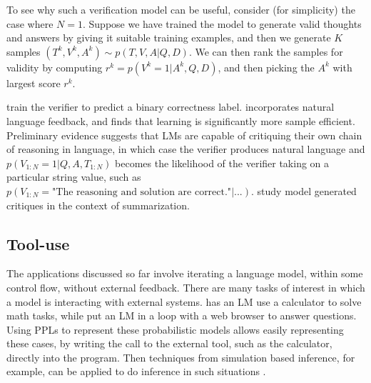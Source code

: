 
To see why such a verification model can be useful,
consider (for simplicity) the case where $N=1$.
Suppose we have trained the model to generate valid
thoughts and answers by giving it suitable training examples,
and then we generate $K$ samples
$(T^k,V^k,A^k) \sim p(T,V,A|Q,D)$.
We can then rank the samples for validity by computing
$r^k = p(V^k=1|A^k, Q, D)$,
and then picking the  $A^k$ with largest score $r^k$.

\citet{verifiers} train the verifier to predict a binary correctness label.  \citet{language_feedback} incorporates natural language feedback, and finds that learning is significantly more sample efficient. Preliminary evidence suggests that LMs are capable of critiquing their own chain of reasoning in language, in which case the verifier produces natural language and $p(V_{1:N} = 1 | Q, A, T_{1:N})$ becomes the likelihood of the verifier taking on a particular string value, such as $p(V_{1:N}=\text{"The reasoning and solution are correct."} | ...)$. \citet{openai_critique} study model generated critiques in the context of summarization.



\begin{comment}
One way to perform inference in this model 
would be to use
particle filtering. The hope is that, by conditioning
on $V_{1:N}=1$,
we increase the probability that the sampled
$T_{1:N}$ values constitute
a valid chain of reasoning
for deriving $A$ from $Q$ and $D$.
This can then provide higher quality training data
in an EM-like fine-tuning scheme, similar
to STaR in \cref{sec:STAR}.
However, we leave evaluation of this idea to future work.
\end{comment}

\subsection{Tool-use}
The applications discussed so far involve iterating a language model, within some control flow, without external feedback. There are many tasks of interest in which a model is interacting with external systems. \citet{verifiers} has an LM use a calculator to solve math tasks, while \citet{webgpt} put an LM in a loop with a web browser to answer questions. Using PPLs to represent these probabilistic models allows easily representing these cases, by writing the call to the external tool, such as the calculator, directly
into the program.
Then techniques from simulation based inference, for example, can be applied to do inference in such situations \cite{simulation_inference}.

\begin{comment}
\charles{Suggest cut for time.}
\kevin{Agreed}

\end{comment}
